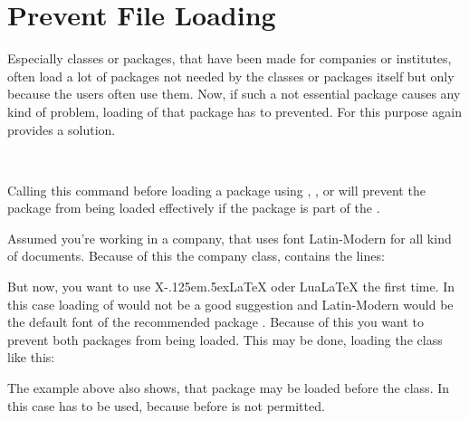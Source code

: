 \section{Prevent File Loading}
\label{sec:scrlfile.prevent}

Especially classes or packages, that have
been made for companies or institutes, often load a lot of packages not needed
by the classes or packages itself but only because the users often use
them. Now, if such a not essential package causes any kind of problem, loading
of that package has to prevented. For this purpose  again
provides a solution.

\begin{Declaration}
  \\
\end{Declaration}
%
%
Calling this command before loading a
package using ,
, or
 will
prevent the package from being loaded effectively if the package is part of
the .
%
\begin{Example}
  Assumed you're working in a company, that uses font Latin-Modern for all
  kind of documents. Because of this the company class, 
  contains the lines:
\begin{lstcode}
  \RequirePackage[T1]{fontenc}
  \RequirePackage{lmodern}
\end{lstcode}
  But now, you want to use
  X\kern-.125em\lower.5ex\hbox{}\LaTeX{} oder Lua\LaTeX{} the
  first time. In this case loading of  would not be a good
  suggestion and Latin-Modern would be the default font of the recommended
  package . Because of this you want to prevent both
  packages from being loaded. This may be done, loading the class like this:
\end{Example}
The example above also shows, that package  may be loaded
before the class. In this case 
has to be used, because  before  is not
permitted.

